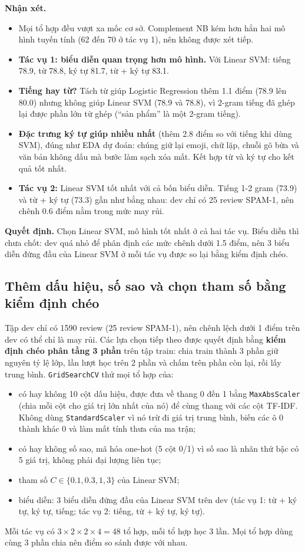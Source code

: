 \textbf{Nhận xét.}
\begin{itemize}[leftmargin=1.5cm]
    \item Mọi tổ hợp đều vượt xa mốc cơ sở. Complement NB kém hơn hẳn hai mô hình tuyến tính (62 đến 70 ở tác vụ 1), nên không được xét tiếp.
    \item \textbf{Tác vụ 1: biểu diễn quan trọng hơn mô hình.} Với Linear SVM: tiếng 78.9, từ 78.8, ký tự 81.7, từ + ký tự 83.1.
    \item \textbf{Tiếng hay từ?} Tách từ giúp Logistic Regression thêm 1.1 điểm (78.9 lên 80.0) nhưng không giúp Linear SVM (78.9 và 78.8),
          vì 2-gram tiếng đã ghép lại được phần lớn từ ghép (``sản phẩm'' là một 2-gram tiếng).
    \item \textbf{Đặc trưng ký tự giúp nhiều nhất} (thêm 2.8 điểm so với tiếng khi dùng SVM), đúng như EDA dự đoán: chúng giữ lại emoji, chữ lặp,
          chuỗi gõ bừa và văn bản không dấu mà bước làm sạch xóa mất. Kết hợp từ và ký tự cho kết quả tốt nhất.
    \item \textbf{Tác vụ 2:} Linear SVM tốt nhất với cả bốn biểu diễn. Tiếng 1-2 gram (73.9) và từ + ký tự (73.3) gần như bằng nhau:
          dev chỉ có 25 review SPAM-1, nên chênh 0.6 điểm nằm trong mức may rủi.
\end{itemize}

\textbf{Quyết định.} Chọn Linear SVM, mô hình tốt nhất ở cả hai tác vụ. Biểu diễn thì chưa chốt: dev quá nhỏ để phân định các mức chênh dưới 1.5 điểm,
nên 3 biểu diễn đứng đầu của Linear SVM ở mỗi tác vụ được so lại bằng kiểm định chéo.

\subsection{Thêm dấu hiệu, số sao và chọn tham số bằng kiểm định chéo}
\label{sec:text-cv}
Tập dev chỉ có 1590 review (25 review SPAM-1), nên chênh lệch dưới 1 điểm trên dev có thể chỉ là may rủi. Các lựa chọn tiếp theo được quyết định
bằng \textbf{kiểm định chéo phân tầng 3 phần} trên tập train: chia train thành 3 phần giữ nguyên tỷ lệ lớp, lần lượt học trên 2 phần và chấm trên
phần còn lại, rồi lấy trung bình. \texttt{GridSearchCV} thử mọi tổ hợp của:
\begin{itemize}[leftmargin=1.5cm]
    \item có hay không 10 cột dấu hiệu, được đưa về thang 0 đến 1 bằng \texttt{MaxAbsScaler} (chia mỗi cột cho giá trị lớn nhất của nó) để cùng thang
          với các cột TF-IDF. Không dùng \texttt{StandardScaler} vì nó trừ đi giá trị trung bình, biến các ô 0 thành khác 0 và làm mất tính thưa của ma trận;
    \item có hay không số sao, mã hóa one-hot (5 cột 0/1) vì số sao là nhãn thứ bậc có 5 giá trị, không phải đại lượng liên tục;
    \item tham số $C \in \{0.1, 0.3, 1, 3\}$ của Linear SVM;
    \item biểu diễn: 3 biểu diễn đứng đầu của Linear SVM trên dev (tác vụ 1: từ + ký tự, ký tự, tiếng; tác vụ 2: tiếng, từ + ký tự, ký tự).
\end{itemize}
Mỗi tác vụ có $3 \times 2 \times 2 \times 4 = 48$ tổ hợp, mỗi tổ hợp học 3 lần. Mọi tổ hợp dùng cùng 3 phần chia nên điểm so sánh được với nhau.


